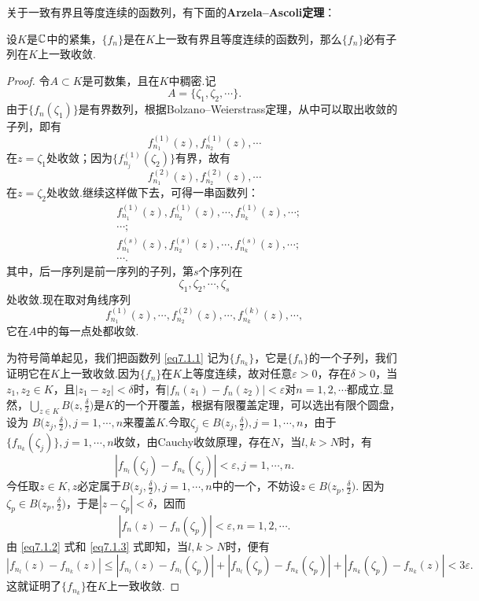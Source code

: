 关于一致有界且等度连续的函数列，有下面的\textbf{Arzela--Ascoli定理}：
\begin{theorem}\label{thm7.1.4}
  设$K$是$\mathbb C$中的紧集，$\{f_n\}$是在$K$上一致有界且等度连续的函数列，那么$\{f_n\}$必有子列在$K$上一致收敛.
\end{theorem}
\begin{proof}
  令$A\subset K$是可数集，且在$K$中稠密.记
  \[
    A = \{\zeta_1,\zeta_2,\cdots\}.
  \]
  由于$\{f_n(\zeta_1)\}$是有界数列，根据Bolzano--Weierstrass定理，从中可以取出收敛的子列，即有
  \[
    f_{n_1}^{(1)}(z),f_{n_2}^{(1)}(z),\cdots
  \]
  在$z=\zeta_1$处收敛；因为$\{f_{n_j}^{(1)}(\zeta_2)\}$有界，故有
  \[
    f_{n_1}^{(2)}(z),f_{n_2}^{(2)}(z),\cdots
  \]
  在$z=\zeta_2$处收敛.继续这样做下去，可得一串函数列：
  \begin{align*}
    & f_{n_1}^{(1)}(z),f_{n_2}^{(1)}(z),\cdots,f_{n_k}^{(1)}(z),\cdots;\\
    & \cdots;\\
    & f_{n_1}^{(s)}(z),f_{n_2}^{(s)}(z),\cdots,f_{n_k}^{(s)}(z),\cdots;\\
    & \cdots.
  \end{align*}
  其中，后一序列是前一序列的子列，第$s$个序列在
  \[
    \zeta_1,\zeta_2,\cdots,\zeta_s
  \]
  处收敛.现在取对角线序列
  \begin{equation}\label{eq7.1.1}
    f_{n_1}^{(1)}(z),\cdots,f_{n_2}^{(2)}(z),\cdots,f_{n_k}^{(k)}(z),\cdots,
  \end{equation}
  它在$A$中的每一点处都收敛.

  为符号简单起见，我们把函数列 \eqref{eq7.1.1} 记为$\{f_{n_k}\}$，它是$\{f_n\}$的一个子列，我们证明它在$K$上一致收敛.因为$\{f_n\}$在$K$上等度连续，故对任意$\varepsilon>0$，存在$\delta>0$，当$z_1,z_2\in K$，且$|z_1-z_2|<\delta$时，有$|f_n(z_1)-f_n(z_2)|<\varepsilon$对$n=1,2,\cdots$都成立.显然，$\bigcup_{z\in K}B\bigg(z,\frac\delta2\bigg)$是$K$的一个开覆盖，根据有限覆盖定理，可以选出有限个圆盘，设为
  $B\bigg(z_j,\frac\delta2\bigg),j=1,\cdots,n$来覆盖$K$.今取$\zeta_j\in B\bigg(z_j,\frac\delta2\bigg),j=1,\cdots,n$，由于$\{f_{n_k}(\zeta_j)\},j=1,\cdots,n$收敛，由Cauchy收敛原理，存在$N$，当$l,k>N$时，有
  \begin{equation}\label{eq7.1.2}
    |f_{n_l}(\zeta_j) - f_{n_k}(\zeta_j)| < \varepsilon, j=1,\cdots,n.
  \end{equation}
  今任取$z\in K,z$必定属于$B\bigg(z_j,\frac\delta2\bigg),j=1,\cdots,n$中的一个，不妨设$z\in B\bigg(z_p,\frac\delta2\bigg)$. 因为$\zeta_p\in B\bigg(z_p,\frac\delta2\bigg)$，于是$|z-\zeta_p|<\delta$，因而
  \begin{equation}\label{eq7.1.3}
    |f_n(z) - f_n(\zeta_p)| < \varepsilon,n=1,2,\cdots.
  \end{equation}
  由 \eqref{eq7.1.2} 式和 \eqref{eq7.1.3} 式即知，当$l,k>N$时，便有
  \begin{equation*}
    |f_{n_l}(z)-f_{n_k}(z)| \le |f_{n_l}(z)-f_{n_l}(\zeta_p)|+
    |f_{n_l}(\zeta_p)-f_{n_k}(\zeta_p)|+|f_{n_k}(\zeta_p)-f_{n_k}(z)|
    < 3\varepsilon.
  \end{equation*}
  这就证明了$\{f_{n_k}\}$在$K$上一致收敛.
\end{proof}


